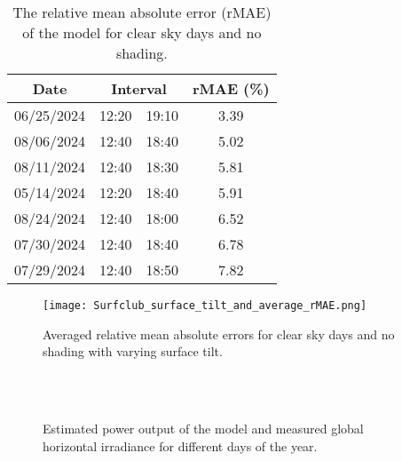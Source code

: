 \begin{table}
    \centering
    \caption{\small Data for the evaluation of the model parameters.}
    \label{tab:PV_system_surfclub_module_parameters}
\end{table}

\begin{table}
    \centering
    \begin{tabular}{cccc}
        \toprule
        \textbf{Date} & \multicolumn{2}{c}{\textbf{Interval}} & \textbf{rMAE (\%)} \\
        \midrule
        06/25/2024 & 12:20 & 19:10 & 3.39 \\
        08/06/2024 & 12:40 & 18:40 & 5.02 \\
        08/11/2024 & 12:40 & 18:30 & 5.81 \\
        05/14/2024 & 12:20 & 18:40 & 5.91 \\
        08/24/2024 & 12:40 & 18:00 & 6.52 \\
        07/30/2024 & 12:40 & 18:40 & 6.78 \\
        07/29/2024 & 12:40 & 18:50 & 7.82 \\
        \bottomrule
    \end{tabular}
    \caption{\small The relative mean absolute error (rMAE) of the model for clear sky days and no shading.}
    \label{tab:Performance_analysis_sunny_days}
\end{table}

\begin{figure}
    \centering
    \texttt{[image: Surfclub\_surface\_tilt\_and\_average\_rMAE.png]}
    \caption{\small Averaged relative mean absolute errors for clear sky days and no shading with varying surface tilt.}
    \label{Surfclub_surface_tilt_and_average_rMAE.png}
\end{figure}

\begin{figure}
    \centering
     \\
     \\
    \caption{\small Estimated power output of the model and measured global horizontal irradiance for different days of the year.}
    \label{fig:Surfclub_estimated_power_vs_GHI_collection}
\end{figure}


